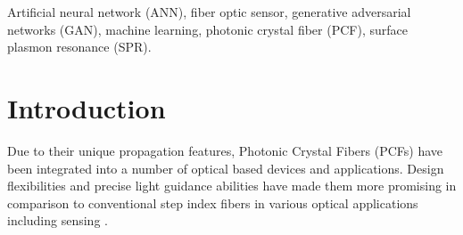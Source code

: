 \documentclass[journal]{IEEEtran}
\begin{document}
\begin{IEEEkeywords}
	Artificial neural network (ANN), fiber optic sensor, generative adversarial networks (GAN), machine learning, photonic crystal fiber (PCF), surface plasmon resonance (SPR).
\end{IEEEkeywords}






%
\IEEEpeerreviewmaketitle



\section{Introduction}
Due to their unique propagation features, Photonic Crystal Fibers (PCFs) have been integrated into a number of optical based devices and applications. Design flexibilities and precise light guidance abilities have made them more promising in comparison to conventional step index fibers in various optical applications including sensing \cite{wang2011selectively}. 
\end{document}
